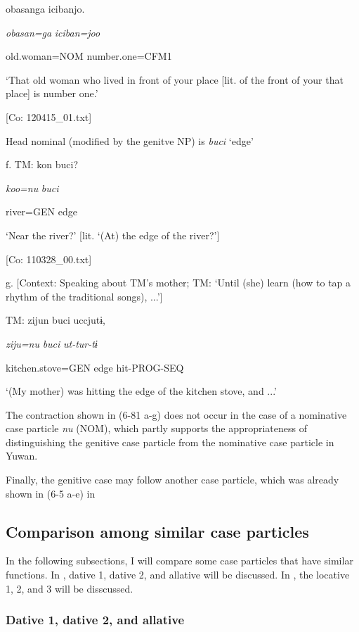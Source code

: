       {\textbar}obasan{\textbar}ga  {\textbar}iciban{\textbar}jo.

      \textit{obasan=ga}  \textit{iciban=joo}

      old.woman=NOM  number.one=CFM1

      ‘That old woman who lived in front of your place [lit. of the front of your that place] is number one.’

      [Co: 120415\_01.txt]

  Head nominal (modified by the genitve NP) is \textit{buci} ‘edge’

  f.  TM:  kon  buci?

      \textit{koo=nu}  \textit{buci}

      river=GEN  edge

      ‘Near the river?’ [lit. ‘(At) the edge of the river?’]

      [Co: 110328\_00.txt]

  g.  [Context: Speaking about TM’s mother; TM: ‘Until (she) learn (how to tap a rhythm of the traditional songs), ...’]

    TM:  zijun  buci  uccjutɨ,

      \textit{ziju=nu}  \textit{buci}  \textit{ut-tur-tɨ}

      kitchen.stove=GEN  edge  hit-PROG-SEQ

      ‘(My mother) was hitting the edge of the kitchen stove, and ...’

The contraction shown in (6-81 a-g) does not occur in the case of a nominative case particle \textit{nu} (NOM), which partly supports the appropriateness of distinguishing the genitive case particle from the nominative case particle in Yuwan.

  Finally, the genitive case may follow another case particle, which was already shown in (6-5 a-e) in 

\subsection{Comparison among similar case particles}

In the following subsections, I will compare some case particles that have similar functions. In , dative 1, dative 2, and allative will be discussed. In , the locative 1, 2, and 3 will be disscussed.

\subsubsection{Dative 1, dative 2, and allative}

